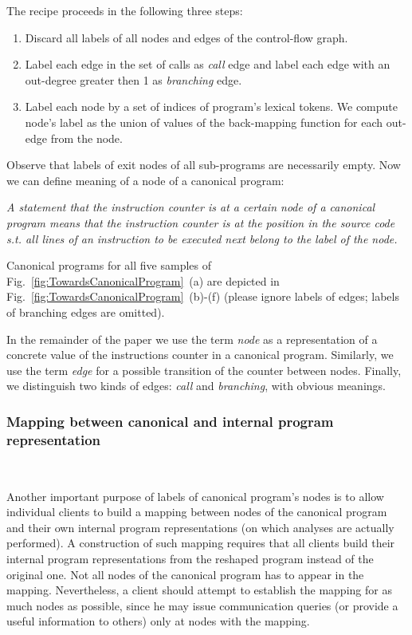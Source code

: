 \documentclass[envcountsame]{llncs}
\begin{document}
\noindent
The recipe proceeds in the following three steps:

\begin{enumerate}
\item Discard all labels of all nodes and edges of the control-flow graph. \item Label each edge in the set of calls as \emph{call} edge and label each
edge with an out-degree greater then 1 as \emph{branching} edge. \item Label each node by a set of indices of program's lexical tokens. We
compute node's label as the union of values of the back-mapping function for
each out-edge from the node.
\end{enumerate}

Observe that labels of exit nodes of all sub-programs are necessarily empty. Now we can define meaning of a node of a canonical program:

\vspace{2mm} \emph{A statement that the instruction counter is at a certain node of a
canonical program means that the instruction counter is at the position in the
source code s.t. all lines of an instruction to be executed next belong to the
label of the node.} \vspace{2mm}

Canonical programs for all five samples of
Fig.~\ref{fig:TowardsCanonicalProgram}~(a) are depicted in
Fig.~\ref{fig:TowardsCanonicalProgram}~(b)-(f) (please ignore labels of edges;
labels of branching edges are omitted).

In the remainder of the paper we use the term \emph{node} as a representation of
a concrete value of the instructions counter in a canonical program. Similarly,
we use the term \emph{edge} for a possible transition of the counter between
nodes. Finally, we distinguish two kinds of edges: \emph{call} and
\emph{branching}, with obvious meanings.


\subsubsection{Mapping between canonical and internal program representation}~\\
\label{sec:MappingCanonicalInternalProgram}

\noindent Another important purpose of labels of canonical program's nodes is to
allow individual clients to build a mapping between nodes of the canonical
program and their own internal program representations (on which analyses are
actually performed). A construction of such mapping requires that all clients
build their internal program representations from the reshaped program instead
of the original one. Not all nodes of the canonical program has to appear in the
mapping. Nevertheless, a client should attempt to establish the mapping for as
much nodes as possible, since he may issue communication queries (or provide a
useful information to others) only at nodes with the mapping.
\end{document}
